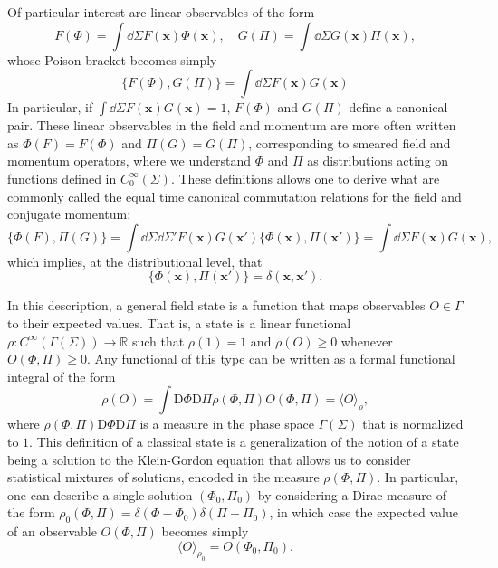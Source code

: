 \documentclass[letterpaper,12pt,titlepage,oneside,final]{book}
\begin{document}
Of particular interest are linear observables of the form
\begin{equation}\label{eq:PhiPiclass}
    F(\Phi) = \int \dd \Sigma F(\bm x) \Phi(\bm x), \quad G(\Pi) = \int \dd \Sigma G(\bm x) \Pi(\bm x),
\end{equation}
whose Poison bracket becomes simply
\begin{equation}
    \{F(\Phi),G(\Pi)\} = \int \dd \Sigma F(\bm x) G(\bm x)
\end{equation}
In particular, if $\int \dd \Sigma F(\bm x) G(\bm x) = 1$, $F(\Phi)$ and $G(\Pi)$ define a canonical pair. These linear observables in the field and momentum are more often written as $\Phi(F) = F(\Phi)$ and $\Pi(G) = G(\Pi)$, corresponding to smeared field and momentum operators, where we understand $\Phi$ and $\Pi$ as distributions acting on functions defined in $C_0^\infty(\Sigma)$. These definitions allows one to derive what are commonly called the equal time canonical commutation relations for the field and conjugate momentum:
\begin{equation}\label{eq:poissonPhiPi}
    \{\Phi(F),\Pi(G)\} = \int \dd \Sigma \dd \Sigma' F(\bm x) G(\bm x') \{\Phi(\bm x), \Pi(\bm x')\} = \int \dd \Sigma F(\bm x) G(\bm x),
\end{equation}
which implies, at the distributional level, that
\begin{equation}
    \{\Phi(\bm x), \Pi(\bm x')\} = \delta(\bm x, \bm x').
\end{equation}

In this description, a general field state is a function that maps observables $O\in\Gamma$ to their expected values. That is, a state is a linear functional $\rho: C^\infty(\Gamma(\Sigma))\longrightarrow \mathbb{R}$ such that $\rho(1) = 1$ and $\rho(O)\geq 0$ whenever $O(\Phi,\Pi)\geq 0$. Any functional of this type can be written as a formal functional integral of the form
\begin{equation}
    \rho(O) = \int \text{D}\Phi \text{D}\Pi \rho(\Phi,\Pi)O(\Phi,\Pi) = \langle O \rangle_{\rho},
\end{equation}
where $\rho(\Phi,\Pi)\text{D}\Phi \text{D}\Pi$ is a measure in the phase space $\Gamma(\Sigma)$ that is normalized to $1$. This definition of a classical state is a generalization of the notion of a state being a solution to the Klein-Gordon equation that allows us to consider statistical mixtures of solutions, encoded in the measure $\rho(\Phi,\Pi)$. In particular, one can describe a single solution $(\Phi_0,\Pi_0)$ by considering a Dirac measure of the form $\rho_0(\Phi,\Pi) = \delta(\Phi-\Phi_0)\delta(\Pi-\Pi_0)$, in which case the expected value of an observable $O(\Phi,\Pi)$ becomes simply 
\begin{equation}
    \langle O\rangle_{\rho_0} = O(\Phi_0,\Pi_0).
\end{equation}
\end{document}
